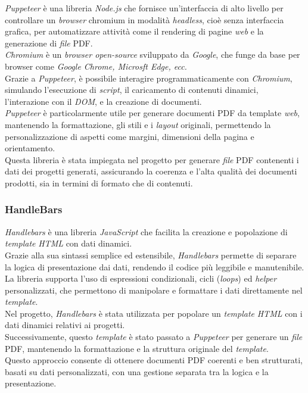 \textit{Puppeteer} è una libreria \textit{Node.js} che fornisce un'interfaccia di alto livello per controllare un \textit{browser} \gls{chromium} in modalità \textit{headless}, cioè senza interfaccia grafica, per automatizzare attività come il rendering di pagine \textit{web} e la generazione di \textit{file} PDF.\\
\textit{Chromium} è un \textit{browser open-source} sviluppato da \textit{Google}, che funge da base per browser come \textit{Google Chrome, Microsft Edge, ecc.}\\

\noindent Grazie a \textit{Puppeteer}, è possibile interagire programmaticamente con \textit{Chromium}, simulando l'esecuzione di \textit{script}, il caricamento di contenuti dinamici, l'interazione con il \textit{DOM}, e la creazione di documenti.\\

\noindent \textit{Puppeteer} è particolarmente utile per generare documenti PDF da template \textit{web}, mantenendo la formattazione, gli stili e i \textit{layout} originali, permettendo la personalizzazione di aspetti come margini, dimensioni della pagina e orientamento.\\
Questa libreria è stata impiegata nel progetto per generare \textit{file} PDF contenenti i dati dei progetti generati, assicurando la coerenza e l'alta qualità dei documenti prodotti, sia in termini di formato che di contenuti.

\subsubsection{HandleBars}

\textit{Handlebars} è una libreria \textit{JavaScript} che facilita la creazione e popolazione di \textit{template} \textit{HTML} con dati dinamici.\\
Grazie alla sua sintassi semplice ed estensibile, \textit{Handlebars} permette di separare la logica di presentazione dai dati, rendendo il codice più leggibile e manutenibile. \\
La libreria supporta l'uso di espressioni condizionali, cicli (\textit{loops}) ed \textit{helper} personalizzati, che permettono di manipolare e formattare i dati direttamente nel \textit{template}.\\

\pagebreak
\noindent Nel progetto, \textit{Handlebars} è stata utilizzata per popolare un \textit{template} \textit{HTML} con i dati dinamici relativi ai progetti. \\
Successivamente, questo \textit{template} è stato passato a \textit{Puppeteer} per generare un \textit{file} PDF, mantenendo la formattazione e la struttura originale del \textit{template}.\\
Questo approccio consente di ottenere documenti PDF coerenti e ben strutturati, basati su dati personalizzati, con una gestione separata tra la logica e la presentazione.

